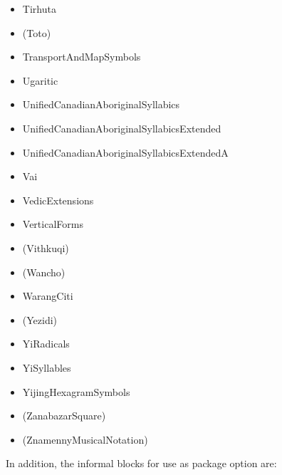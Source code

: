 \documentclass{article}
\newenvironment{itemlist}{%
  \begin{itemize}
  \setlength{\itemsep}{0pt}
  \setlength{\parsep}{0pt}
  \setlength{\topsep}{0pt}
  \setlength{\partopsep}{0pt}
  \setlength{\parskip}{0pt}
  \setlength{\labelsep}{5pt}}%
{
  \end{itemize}}
\begin{document}
\begin{multicols*}{2}
\begin{itemlist}
        \item Tirhuta
        \item (Toto)
        \item TransportAndMapSymbols
        \item Ugaritic
        \item UnifiedCanadianAboriginalSyllabics
        \item UnifiedCanadianAboriginalSyllabicsExtended
        \item UnifiedCanadianAboriginalSyllabicsExtendedA
        \item Vai
        \item VedicExtensions
        \item VerticalForms
        \item (Vithkuqi)
        \item (Wancho)
        \item WarangCiti
        \item (Yezidi)
        \item YiRadicals
        \item YiSyllables
        \item YijingHexagramSymbols
        \item (ZanabazarSquare)
        \item (ZnamennyMusicalNotation)
      \end{itemlist}
    \end{multicols*}

    In addition, the informal blocks for use as package option are:
\end{document}
